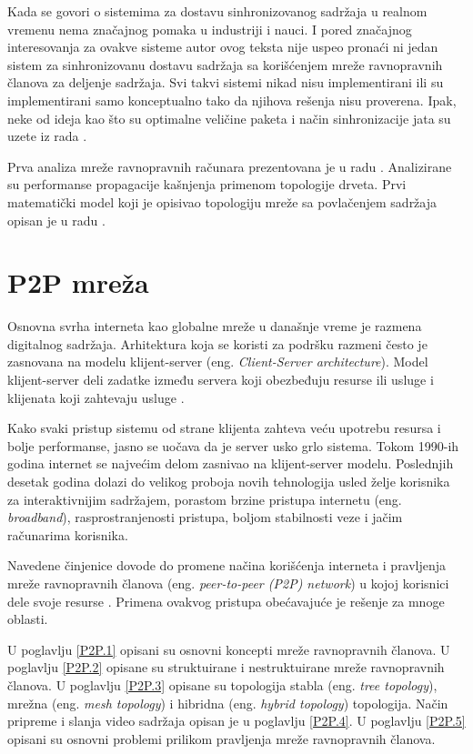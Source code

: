 \documentclass[12pt,oneside]{memoir}
\begin{document}
Kada se govori o sistemima za dostavu sinhronizovanog sadržaja u realnom vremenu nema značajnog pomaka u industriji i nauci. I pored značajnog interesovanja za ovakve sisteme autor ovog teksta nije uspeo pronaći ni jedan sistem za sinhronizovanu dostavu sadržaja sa korišćenjem mreže ravnopravnih članova za deljenje sadržaja. Svi takvi sistemi nikad nisu implementirani ili su implementirani samo konceptualno tako da njihova rešenja nisu proverena. Ipak, neke od ideja kao što su optimalne veličine paketa i način sinhronizacije jata su uzete iz rada \cite{Zhang4698112}.

Prva analiza mreže ravnopravnih računara prezentovana je u radu \cite{Small}. Analizirane su performanse propagacije kašnjenja primenom topologije drveta. Prvi matematički model koji je opisivao topologiju mreže sa povlačenjem sadržaja opisan je u radu \cite{EURECOM+2326}.

\chapter{P2P mreža}
\label{chp:p2p-uvod}

Osnovna svrha interneta kao globalne mreže u današnje vreme je razmena digitalnog sadržaja. Arhitektura koja se koristi za podršku razmeni često je zasnovana na modelu klijent-server (eng. \textit{Client-Server architecture}). Model klijent-server deli zadatke između servera koji obezbeđuju resurse ili usluge i klijenata koji zahtevaju usluge \cite{DeBoever07}.

Kako svaki pristup sistemu od strane klijenta zahteva veću upotrebu resursa i bolje performanse, jasno se uočava da je server usko grlo sistema. 
Tokom 1990-ih godina internet se najvećim delom zasnivao na klijent-server modelu. Poslednjih desetak godina dolazi do velikog proboja novih tehnologija usled želje korisnika za interaktivnijim sadržajem, porastom brzine pristupa internetu (eng. \textit{broadband}), rasprostranjenosti pristupa, boljom stabilnosti veze i jačim računarima korisnika.

Navedene činjenice dovode do promene načina korišćenja interneta i pravljenja mreže ravnopravnih članova (eng. \textit{peer-to-peer (P2P) network}) u kojoj korisnici dele svoje resurse \cite{Tanenbaum}. Primena ovakvog pristupa obećavajuće je rešenje za mnoge oblasti.

U poglavlju \ref{P2P.1} opisani su osnovni koncepti mreže ravnopravnih članova. U poglavlju \ref{P2P.2} opisane su struktuirane i nestruktuirane mreže ravnopravnih članova. U poglavlju \ref{P2P.3} opisane su topologija stabla (eng. \textit{tree topology}), mrežna (eng. \textit{mesh topology}) i hibridna (eng. \textit{hybrid topology}) topologija. Način pripreme i slanja video sadržaja opisan je u poglavlju \ref{P2P.4}. U poglavlju \ref{P2P.5} opisani su osnovni problemi prilikom pravljenja mreže ravnopravnih članova.
\end{document}
